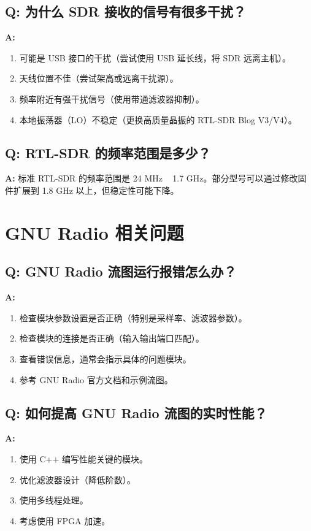 \documentclass[12pt,UTF8]{ctexbook}
\begin{document}
\subsection{Q: 为什么 SDR 接收的信号有很多干扰？}
\textbf{A:}
\begin{enumerate}[leftmargin=2cm]
    \item 可能是 USB 接口的干扰（尝试使用 USB 延长线，将 SDR 远离主机）。
    \item 天线位置不佳（尝试架高或远离干扰源）。
    \item 频率附近有强干扰信号（使用带通滤波器抑制）。
    \item 本地振荡器（LO）不稳定（更换高质量晶振的 RTL-SDR Blog V3/V4）。
\end{enumerate}

\subsection{Q: RTL-SDR 的频率范围是多少？}
\textbf{A:} 标准 RTL-SDR 的频率范围是 24 MHz ~ 1.7 GHz。部分型号可以通过修改固件扩展到 1.8 GHz 以上，但稳定性可能下降。

\section{GNU Radio 相关问题}
\label{sec:faq_gnuradio}

\subsection{Q: GNU Radio 流图运行报错怎么办？}
\textbf{A:}
\begin{enumerate}[leftmargin=2cm]
    \item 检查模块参数设置是否正确（特别是采样率、滤波器参数）。
    \item 检查模块的连接是否正确（输入输出端口匹配）。
    \item 查看错误信息，通常会指示具体的问题模块。
    \item 参考 GNU Radio 官方文档和示例流图。
\end{enumerate}

\subsection{Q: 如何提高 GNU Radio 流图的实时性能？}
\textbf{A:}
\begin{enumerate}[leftmargin=2cm]
    \item 使用 C++ 编写性能关键的模块。
    \item 优化滤波器设计（降低阶数）。
    \item 使用多线程处理。
    \item 考虑使用 FPGA 加速。
\end{enumerate}
\end{document}
